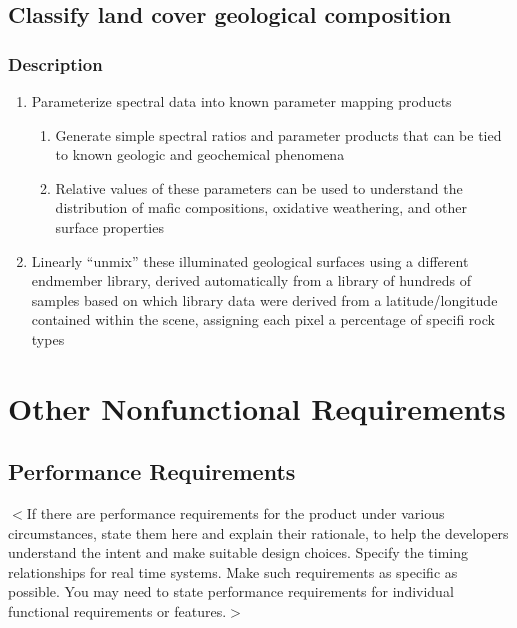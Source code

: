 \documentclass{scrreprt}
\begin{document}
\section{Classify land cover geological composition}
\subsection{Description}
\begin{enumerate}
	\item Parameterize spectral data into known parameter mapping products
		
     		\begin{enumerate}
		\item Generate simple spectral ratios and parameter products that 
			can be tied to known geologic and geochemical phenomena
		\item Relative values of these parameters can be used to understand the 
			distribution of mafic compositions, oxidative weathering, and other 
				surface properties
		\end{enumerate}
	\item Linearly ``unmix'' these illuminated geological surfaces using a 
		different endmember library, derived automatically from a library 
		of hundreds of samples based on which library data were derived from 
		a latitude/longitude contained within the scene, assigning each pixel
		a percentage of specifi rock types
\end{enumerate}

\chapter{Other Nonfunctional Requirements}

\section{Performance Requirements}
$<$If there are performance requirements for the product under various 
circumstances, state them here and explain their rationale, to help the 
developers understand the intent and make suitable design choices. Specify the 
timing relationships for real time systems. Make such requirements as specific 
as possible. You may need to state performance requirements for individual 
functional requirements or features.$>$
\end{document}
